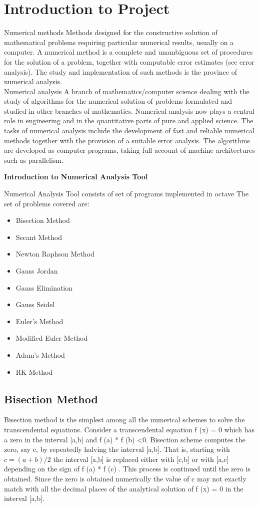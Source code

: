 \section{Introduction to Project}

 Numerical methods Methods designed for the constructive solution of mathematical problems requiring particular numerical results, usually on a computer. A numerical method is a complete and unambiguous set of procedures for the solution of a problem, together with computable error estimates (see error analysis). The study and implementation of such methods is the province of numerical analysis.\\
 Numerical analysis A branch of mathematics/computer science dealing with the study of algorithms for the numerical solution of problems formulated and studied in other branches of mathematics. Numerical analysis now plays a central role in engineering and in the quantitative parts of pure and applied science. The tasks of numerical analysis include the development of fast and reliable numerical methods together with the provision of a suitable error analysis. The algorithms are developed as computer programs, taking full account of machine architectures such as parallelism.

\textbf{Introduction to Numerical Analysis Tool}

Numerical Analysis Tool consists of set of programs implemented in octave
The set of problems covered are:
\begin{itemize}
\item Bisection Method
\item Secant Method
\item Newton Raphson Method
\item Gauss Jordan
\item Gauss Elimination
\item Gauss Seidel
\item Euler's Method
\item Modified Euler Method
\item Adam's Method
\item RK Method
\end{itemize}


\subsection{Bisection Method}
Bisection method is the simplest among all the numerical schemes to solve the transcendental equations. Consider a transcendental equation f (x) = 0  which has a zero in the interval [a,b] and f (a) * f (b) \textless 0. Bisection scheme computes the zero, say c, by repeatedly halving the interval [a,b]. That is, starting with 
$c = (a+b) / 2$
the interval [a,b] is replaced either with [c,b] or with [a,c] depending on the sign of f (a) * f (c) . This process is continued until the zero is obtained. Since the zero is obtained numerically the value of c may not exactly match with all the decimal places of the analytical solution of f (x) = 0 in the interval [a,b]. \\

